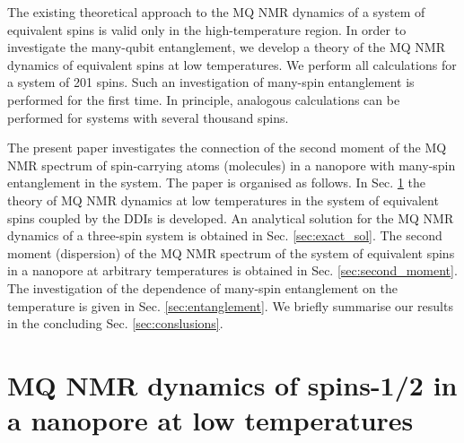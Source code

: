 \documentclass[%
 reprint,
superscriptaddress,
 amsmath,amssymb,
]{revtex4-2}
\begin{document}
\par
The existing theoretical approach \cite{lab:mq_nmr_dyn_in_nanopores_2009} to the MQ NMR dynamics of a system of equivalent spins is valid only in the high-temperature region. In order to investigate the many-qubit entanglement, we develop a theory of the MQ NMR dynamics of equivalent spins at low temperatures. 
We perform all calculations for a system of 201 spins. 
Such an investigation of many-spin entanglement is performed for the first time.
In principle, analogous calculations can be performed for  systems with several thousand  spins. 
\par
The present paper investigates the connection of the second moment of the MQ NMR spectrum of spin-carrying atoms (molecules) in a nanopore with many-spin entanglement in the system. The paper is organised as follows. In Sec. \ref{sec:mq_dyn} the theory of MQ NMR dynamics at low temperatures in the system of equivalent spins coupled by the DDIs is developed. An analytical solution for the MQ NMR dynamics of a three-spin system is obtained in Sec. \ref{sec:exact_sol}. The second moment (dispersion) of the MQ NMR spectrum of the system of equivalent spins in a nanopore at arbitrary temperatures is obtained in Sec. \ref{sec:second_moment}. The investigation of the dependence of  many-spin entanglement on the temperature is given in Sec. \ref{sec:entanglement}. We briefly summarise our results in the concluding Sec. \ref{sec:conslusions}.


\section{MQ NMR dynamics of spins-1/2 in a nanopore at low temperatures}
\label{sec:mq_dyn}
\end{document}
